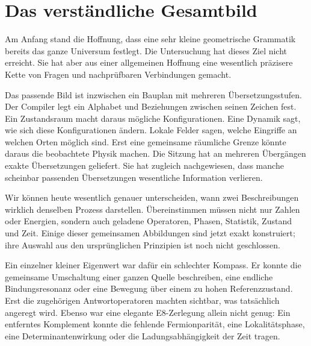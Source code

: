 \documentclass[11pt,a4paper,oneside,parskip=half,headings=normal,numbers=noenddot,bibliography=totoc]{scrreprt}
\newcommand{\finding}[2]{\begin{tcolorbox}[enhanced,breakable,colback=pale,colframe=teal,boxrule=0pt,borderline west={2pt}{0pt}{teal},arc=0mm,left=3mm,right=3mm,top=2mm,bottom=2mm,title={#1},coltitle=ink,colbacktitle=pale,fonttitle=\sffamily\bfseries]#2\end{tcolorbox}}
\begin{document}
\section{Das verständliche Gesamtbild}
Am Anfang stand die Hoffnung, dass eine sehr kleine geometrische Grammatik bereits das ganze Universum festlegt. Die Untersuchung hat dieses Ziel nicht erreicht. Sie hat aber aus einer allgemeinen Hoffnung eine wesentlich präzisere Kette von Fragen und nachprüfbaren Verbindungen gemacht.

Das passende Bild ist inzwischen ein Bauplan mit mehreren Übersetzungsstufen. Der Compiler legt ein Alphabet und Beziehungen zwischen seinen Zeichen fest. Ein Zustandsraum macht daraus mögliche Konfigurationen. Eine Dynamik sagt, wie sich diese Konfigurationen ändern. Lokale Felder sagen, welche Eingriffe an welchen Orten möglich sind. Erst eine gemeinsame räumliche Grenze könnte daraus die beobachtete Physik machen. Die Sitzung hat an mehreren Übergängen exakte Übersetzungen geliefert. Sie hat zugleich nachgewiesen, dass manche scheinbar passenden Übersetzungen wesentliche Information verlieren.

\finding{Der wichtigste gemeinsame Fortschritt}{Wir können heute wesentlich genauer unterscheiden, wann zwei Beschreibungen wirklich denselben Prozess darstellen. Übereinstimmen müssen nicht nur Zahlen oder Energien, sondern auch geladene Operatoren, Phasen, Statistik, Zustand und Zeit. Einige dieser gemeinsamen Abbildungen sind jetzt exakt konstruiert; ihre Auswahl aus den ursprünglichen Prinzipien ist noch nicht geschlossen.}

Ein einzelner kleiner Eigenwert war dafür ein schlechter Kompass. Er konnte die gemeinsame Umschaltung einer ganzen Quelle beschreiben, eine endliche Bindungsresonanz oder eine Bewegung über einem zu hohen Referenzzustand. Erst die zugehörigen Antwortoperatoren machten sichtbar, was tatsächlich angeregt wird. Ebenso war eine elegante E8-Zerlegung allein nicht genug: Ein entferntes Komplement konnte die fehlende Fermionparität, eine Lokalitätsphase, eine Determinantenwirkung oder die Ladungsabhängigkeit der Zeit tragen.
\end{document}
